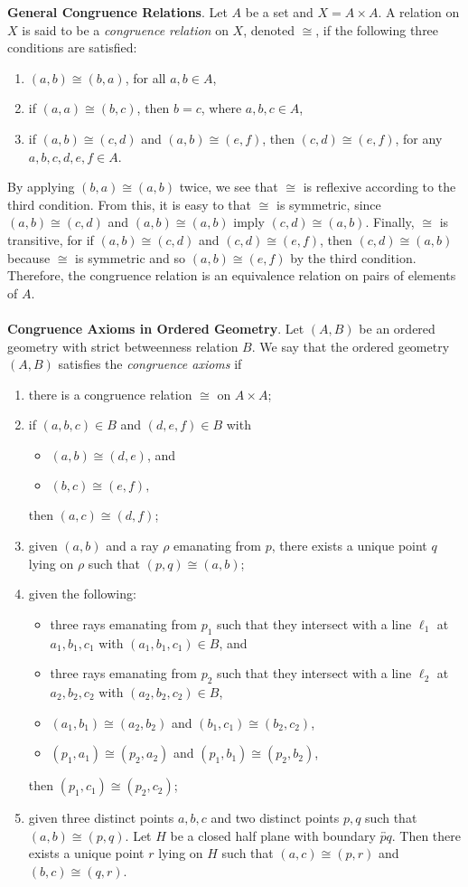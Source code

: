 \documentclass[12pt]{article}
\renewcommand{\line}[1]{\overleftrightarrow{#1}}
\begin{document}

\textbf{General Congruence Relations}.  Let $A$ be a set and
$X=A\times A$. A relation on $X$ is said to be a \emph{congruence
relation} on $X$, denoted $\cong$, if the following three conditions
are satisfied:
\begin{enumerate}
\item $(a,b)\cong (b,a)$, for all $a,b\in A$,
\item if $(a,a)\cong (b,c)$, then $b=c$, where $a,b,c\in A$,
\item if $(a,b)\cong (c,d)$ and $(a,b)\cong (e,f)$, then $(c,d)\cong
(e,f)$, for any $a,b,c,d,e,f\in A$.
\end{enumerate}
By applying $(b,a)\cong (a,b)$ twice, we see that $\cong$ is reflexive according to the third condition.  From this, it is easy to that $\cong$ is symmetric, since $(a,b)\cong (c,d)$ and $(a,b)\cong (a,b)$ imply $(c,d)\cong (a,b)$.  Finally, $\cong$ is transitive, for if $(a,b)\cong (c,d)$ and $(c,d)\cong
(e,f)$, then $(c,d)\cong (a,b)$ because $\cong$ is symmetric and so
$(a,b)\cong (e,f)$ by the third condition.  Therefore, the
congruence relation is an equivalence relation on pairs of elements
of $A$.
\\\\
\textbf{Congruence Axioms in Ordered Geometry}. Let $(A,B)$ be an
 ordered geometry with strict betweenness relation $B$.
We say that the ordered geometry $(A,B)$ satisfies the \emph{congruence
axioms} if
\begin{enumerate}
\item there is a congruence relation $\cong$ on $A\times A$;
\item if $(a,b,c)\in B$ and $(d,e,f)\in B$ with
\begin{itemize}
\item $(a,b)\cong (d,e)$, and
\item $(b,c)\cong (e,f),$
\end{itemize}
then $(a,c)\cong (d,f)$;
\item given $(a,b)$ and a ray $\rho$ emanating from $p$,
there exists a unique point $q$ lying on $\rho$ such that
$(p,q)\cong (a,b)$;
\item given the following:
\begin{itemize}
\item three rays emanating from $p_1$ such that they intersect with a
line $\ell_1$ at $a_1,b_1,c_1$ with $(a_1,b_1,c_1)\in B$, and
\item three rays emanating from $p_2$ such that they intersect with a
line $\ell_2$ at $a_2,b_2,c_2$ with $(a_2,b_2,c_2)\in B$,
\item $(a_1,b_1)\cong (a_2,b_2)$ and $(b_1,c_1)\cong (b_2,c_2)$,
\item $(p_1,a_1)\cong (p_2,a_2)$ and $(p_1,b_1)\cong (p_2,b_2)$,
\end{itemize}
then $(p_1,c_1)\cong (p_2,c_2)$;
\item given three distinct points $a,b,c$ and two distinct points $p,q$ such that $(a,b)\cong (p,q)$.  Let $H$ be a closed half plane with boundary
$\line{pq}$.  Then there exists a unique point $r$ lying on $H$ such
that $(a,c)\cong (p,r)$ and $(b,c)\cong (q,r)$.
\end{enumerate}
\end{document}
